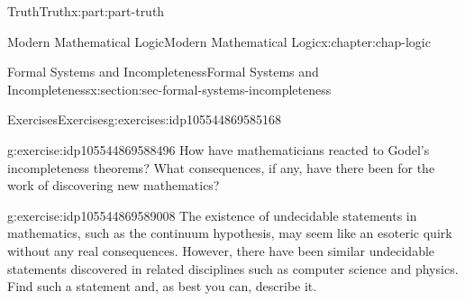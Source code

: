 \documentclass[oneside,10pt,]{book}
\numberwithin{equation}{section}
\begin{document}
\begin{partptx}{Truth}{}{Truth}{}{}{x:part:part-truth}
\begin{chapterptx}{Modern Mathematical Logic}{}{Modern Mathematical Logic}{}{}{x:chapter:chap-logic}
\begin{sectionptx}{Formal Systems and Incompleteness}{}{Formal Systems and Incompleteness}{}{}{x:section:sec-formal-systems-incompleteness}
\begin{exercises-subsection}{Exercises}{}{Exercises}{}{}{g:exercises:idp105544869585168}
\begin{divisionexercise}{1}{}{}{g:exercise:idp105544869588496}
How have mathematicians reacted to Godel's incompleteness theorems? What consequences, if any, have there been for the work of discovering new mathematics?%
\end{divisionexercise}%
\begin{divisionexercise}{2}{}{}{g:exercise:idp105544869589008}%
The existence of undecidable statements in mathematics, such as the continuum hypothesis, may seem like an esoteric quirk without any real consequences. However, there have been similar undecidable statements discovered in related disciplines such as computer science and physics. Find such a statement and, as best you can, describe it.%
\end{divisionexercise}%
\end{exercises-subsection}
\end{sectionptx}
\end{chapterptx}
\end{partptx}
%
%
\typeout{************************************************}
\typeout{************************************************}
%
\end{document}
